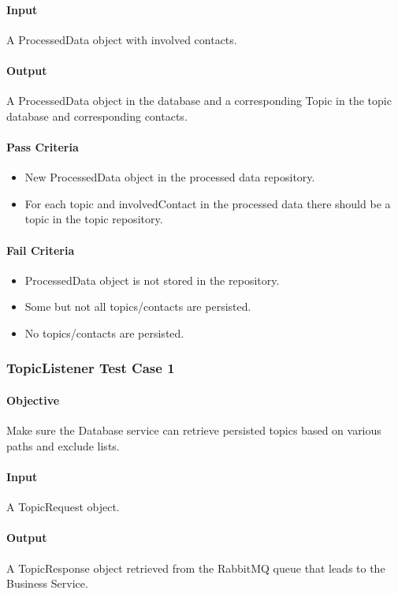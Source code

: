 \documentclass[hidelinks,english]{article}
\begin{document}
				\paragraph{Input} A ProcessedData object with involved contacts.
				\paragraph{Output} A ProcessedData object in the database and a corresponding Topic in the topic database and corresponding contacts.
				\paragraph{Pass Criteria}
				\begin{itemize}
					\item New ProcessedData object in the processed data repository.
					\item For each topic and involvedContact in the processed data there should be a topic in the topic repository.
				\end{itemize}
				\paragraph{Fail Criteria}
				\begin{itemize}
					\item ProcessedData object is not stored in the repository.
					\item Some but not all topics/contacts are persisted.
					\item No topics/contacts are persisted.
				\end{itemize}
				
			\subsubsection{TopicListener Test Case 1}\label{databasetopiclistenertest1}
				\paragraph{Objective} Make sure the Database service can retrieve persisted topics based on various paths and exclude lists.
				\paragraph{Input} A TopicRequest object.
				\paragraph{Output} A TopicResponse object retrieved from the RabbitMQ queue that leads to the Business Service.
\end{document}
